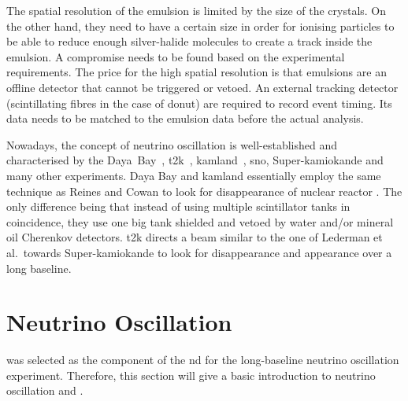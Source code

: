 The spatial resolution of the emulsion is limited by the size of the crystals.
On the other hand, they need to have a certain size in order for ionising particles to be able to reduce enough silver-halide molecules to create a track inside the emulsion.
A compromise needs to be found based on the experimental requirements.
The price for the high spatial resolution is that emulsions are an offline detector that cannot be triggered or vetoed.
An external tracking detector (scintillating fibres in the case of \gls{donut}) are required to record event timing.
Its data needs to be matched to the emulsion data before the actual analysis.

Nowadays, the concept of neutrino oscillation is well-established and characterised by the Daya~Bay~\cite{dayabayRecent}, \gls{t2k}~\cite{t2kOsc}, \gls{kamland}~\cite{kamland}, \gls{sno}, Super-\gls{kamiokande} and many other experiments.
Daya Bay and \gls{kamland} essentially employ the same technique as Reines and Cowan to look for disappearance of nuclear reactor \Pagne.
The only difference being that instead of using multiple scintillator tanks in coincidence, they use one big tank shielded and vetoed by water and/or mineral oil Cherenkov detectors.
\gls{t2k} directs a \Pgngm beam similar to the one of Lederman et al.\ towards Super-\gls{kamiokande} to look for \Pgngm disappearance and \Pgne appearance over a long baseline.


\section{Neutrino Oscillation}
\label{sec:nu-detection_osc}

\AC{} was selected as the \lar{} component of the \gls{nd} for the \dune{} long-baseline neutrino oscillation experiment.
Therefore, this section will give a basic introduction to neutrino oscillation and \dune{}.


